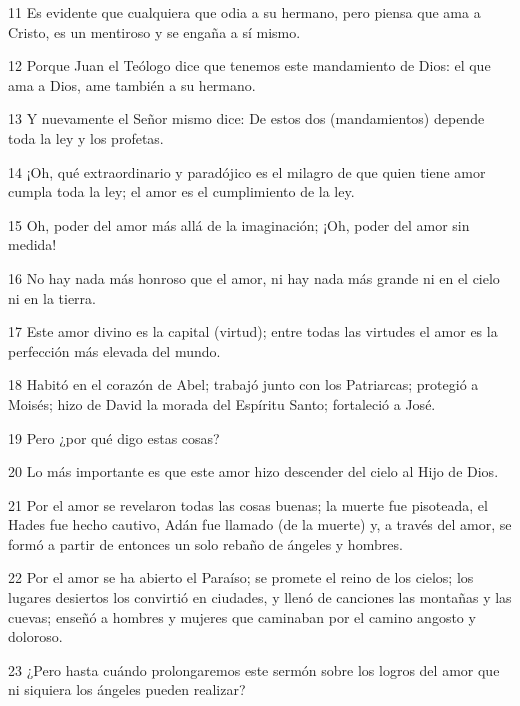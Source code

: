 \par 11 Es evidente que cualquiera que odia a su hermano, pero piensa que ama a Cristo, es un mentiroso y se engaña a sí mismo.

\par 12 Porque Juan el Teólogo dice que tenemos este mandamiento de Dios: el que ama a Dios, ame también a su hermano.

\par 13 Y nuevamente el Señor mismo dice: De estos dos (mandamientos) depende toda la ley y los profetas.

\par 14 ¡Oh, qué extraordinario y paradójico es el milagro de que quien tiene amor cumpla toda la ley; el amor es el cumplimiento de la ley.

\par 15 Oh, poder del amor más allá de la imaginación; ¡Oh, poder del amor sin medida!

\par 16 No hay nada más honroso que el amor, ni hay nada más grande ni en el cielo ni en la tierra.

\par 17 Este amor divino es la capital (virtud); entre todas las virtudes el amor es la perfección más elevada del mundo.

\par 18 Habitó en el corazón de Abel; trabajó junto con los Patriarcas; protegió a Moisés; hizo de David la morada del Espíritu Santo; fortaleció a José.

\par 19 Pero ¿por qué digo estas cosas?

\par 20 Lo más importante es que este amor hizo descender del cielo al Hijo de Dios.

\par 21 Por el amor se revelaron todas las cosas buenas; la muerte fue pisoteada, el Hades fue hecho cautivo, Adán fue llamado (de la muerte) y, a través del amor, se formó a partir de entonces un solo rebaño de ángeles y hombres.

\par 22 Por el amor se ha abierto el Paraíso; se promete el reino de los cielos; los lugares desiertos los convirtió en ciudades, y llenó de canciones las montañas y las cuevas; enseñó a hombres y mujeres que caminaban por el camino angosto y doloroso.

\par 23 ¿Pero hasta cuándo prolongaremos este sermón sobre los logros del amor que ni siquiera los ángeles pueden realizar?

